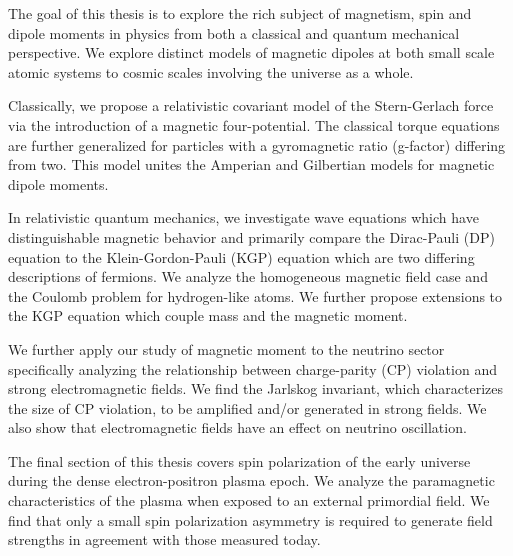 

The goal of this thesis is to explore the rich subject of magnetism, spin and dipole moments in physics from both a classical and quantum mechanical perspective. We explore distinct models of magnetic dipoles at both small scale atomic systems to cosmic scales involving the universe as a whole.

Classically, we propose a relativistic covariant model of the Stern-Gerlach force via the introduction of a magnetic four-potential. The classical torque equations are further generalized for particles with a gyromagnetic ratio (g-factor) differing from two. This model unites the Amperian and Gilbertian models for magnetic dipole moments.

In relativistic quantum mechanics, we investigate wave equations which have distinguishable magnetic behavior and primarily compare the Dirac-Pauli (DP) equation to the Klein-Gordon-Pauli (KGP) equation which are two differing descriptions of fermions. We analyze the homogeneous magnetic field case and the Coulomb problem for hydrogen-like atoms. We further propose extensions to the KGP equation which couple mass and the magnetic moment.

We further apply our study of magnetic moment to the neutrino sector specifically analyzing the relationship between charge-parity (CP) violation and strong electromagnetic fields. We find the Jarlskog invariant, which characterizes the size of CP violation, to be amplified and/or generated in strong fields. We also show that electromagnetic fields have an effect on neutrino oscillation.

The final section of this thesis covers spin polarization of the early universe during the dense electron-positron plasma epoch. We analyze the paramagnetic characteristics of the plasma when exposed to an external primordial field. We find that only a small spin polarization asymmetry is required to generate field strengths in agreement with those measured today.